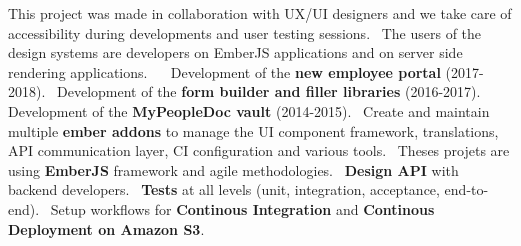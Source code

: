 \documentclass{moderncv}
\begin{document}
{	This project was made in collaboration with UX/UI designers and we take care of accessibility during developments and user testing sessions.\newline~
	The users of the design systems are developers on EmberJS applications and on server side rendering applications.\newline~
	\newline~
	Development of the \textbf{new employee portal} (2017-2018).\newline~
	Development of the \textbf{form builder and filler libraries} (2016-2017).\newline~
	Development of the \textbf{MyPeopleDoc vault} (2014-2015).\newline~
	Create and maintain multiple \textbf{ember addons} to manage the UI component framework, translations, API communication layer, CI configuration and various tools.\newline~
	Theses projets are using \textbf{EmberJS} framework and agile methodologies.\newline~
	\textbf{Design API} with backend developers.\newline~
	\textbf{Tests} at all levels (unit, integration, acceptance, end-to-end).\newline~
	Setup workflows for \textbf{Continous Integration} and \textbf{Continous Deployment on Amazon S3}.
}



\end{document}
